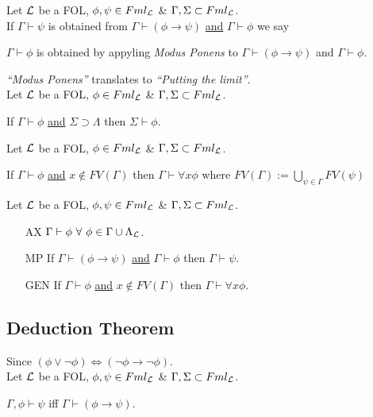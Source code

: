 \documentclass[11pt,a4paper]{article}
\begin{document}
Let $\mathcal{L}$ be a FOL, $\phi,\psi\in Fml_{\mathcal{L}}$ \& $\Gamma,\Sigma\subset Fml_{\mathcal{L}}$.\\
If $\Gamma\vdash\psi$ is obtained from $\Gamma\vdash(\phi\to\psi)$ \underline{and} $\Gamma\vdash\phi$ we say
\begin{center}
$\Gamma\vdash\phi$ is obtained by appyling \textit{Modus Ponens} to $\Gamma\vdash(\phi\to\psi)$ and $\Gamma\vdash\phi$.
\end{center}
\nb \textit{``Modus Ponens''} translates to \textit{``Putting the limit''}.\\

Let $\mathcal{L}$ be a FOL, $\phi\in Fml_{\mathcal{L}}$ \& $\Gamma,\Sigma\subset Fml_{\mathcal{L}}$.
\begin{center}If $\Gamma\vdash\phi$ \underline{and} $\Sigma\supset\Lambda$ then $\Sigma\vdash\phi$.\end{center}

Let $\mathcal{L}$ be a FOL, $\phi\in Fml_{\mathcal{L}}$ \& $\Gamma,\Sigma\subset Fml_{\mathcal{L}}$.
\begin{center}
If $\Gamma\vdash \phi$ \underline{and} $x\not\in FV(\Gamma)$ then $\Gamma\vdash\forall x\phi$ where $FV(\Gamma):=\bigcup\limits_{\psi\in\Gamma}FV(\psi)$
\end{center}

Let $\mathcal{L}$ be a FOL, $\phi,\psi\in Fml_{\mathcal{L}}$ \& $\Gamma,\Sigma\subset Fml_{\mathcal{L}}$.
\begin{itemize}
	\item[AX] $\Gamma\vdash\phi\ \forall\ \phi\in\Gamma\cup\Lambda_\LL$.
	\item[MP] If $\Gamma\vdash(\phi\to\psi)$ \underline{and} $\Gamma\vdash\phi$ then $\Gamma\vdash\psi$.
	\item[GEN] If $\Gamma\vdash\phi$ \underline{and} $x\not\in FV(\Gamma)$ then $\Gamma\vdash\forall x\phi$.
\end{itemize}

\subsection{Deduction Theorem}

Since $(\phi\vee\neg\phi)\Leftrightarrow(\neg\phi\to\neg\phi)$.\\

Let $\mathcal{L}$ be a FOL, $\phi,\psi\in Fml_{\mathcal{L}}$ \& $\Gamma,\Sigma\subset Fml_{\mathcal{L}}$.
\begin{center}$\Gamma,\phi\vdash\psi$ iff $\Gamma\vdash(\phi\to\psi)$.\end{center}
\end{document}
